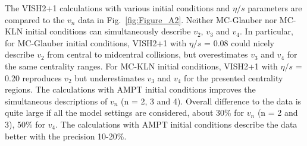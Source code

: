 The VISH2+1 calculations with various initial conditions and $\eta/s$ parameters are compared to the $v_n$ data in Fig.~\ref{fig:Figure_A2}.
Neither MC-Glauber nor MC-KLN initial conditions can simultaneously describe $v_2$, $v_3$ and $v_4$. In particular, for MC-Glauber initial conditions, VISH2+1 with $\eta/s$ = 0.08 could nicely describe $v_2$ from central to midcentral collisions, but overestimates $v_3$ and $v_4$ for the same centrality ranges. For MC-KLN initial conditions, VISH2+1 with $\eta/s$ = 0.20 reproduces $v_2$ but underestimates $v_3$ and $v_4$ for the presented centrality regions. The calculations with AMPT initial conditions improves the simultaneous descriptions of $v_n$ (n = 2, 3 and 4). Overall difference to the data is quite large if all the model settings are considered, about 30\% for $v_n$ (n = 2 and 3),  50\% for $v_4$. The calculations with AMPT initial conditions describe the data better with the precision 10-20\%.

